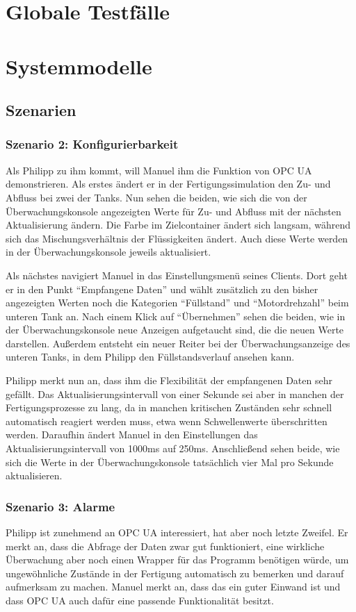 \documentclass[parskip=full]{scrartcl}
\begin{document}
\section{Globale Testfälle}
\Blindtext[1]

\section{Systemmodelle}
\subsection{Szenarien}
\subsubsection{Szenario 2: Konfigurierbarkeit}
Als Philipp zu ihm kommt, will Manuel ihm die Funktion von OPC UA demonstrieren.
Als erstes ändert er in der Fertigungssimulation den Zu- und Abfluss bei zwei der Tanks. Nun sehen die beiden, wie
sich die von der Überwachungskonsole angezeigten Werte für Zu- und Abfluss mit der nächsten Aktualisierung ändern. Die
Farbe im Zielcontainer ändert sich langsam, während sich das Mischungsverhältnis der Flüssigkeiten ändert. Auch diese
Werte werden in der Überwachungskonsole jeweils aktualisiert.

Als nächstes navigiert Manuel in das Einstellungsmenü seines Clients. Dort geht er in den Punkt ``Empfangene Daten'' und
wählt zusätzlich zu den bisher angezeigten Werten noch die Kategorien ``Füllstand'' und ``Motordrehzahl'' beim unteren Tank
an. Nach einem Klick auf ``Übernehmen'' sehen die beiden, wie in der Überwachungskonsole neue Anzeigen aufgetaucht sind,
die die neuen Werte darstellen. Außerdem entsteht ein neuer Reiter bei der Überwachungsanzeige des unteren Tanks,
in dem Philipp den Füllstandsverlauf ansehen kann.

Philipp merkt nun an, dass ihm die Flexibilität der empfangenen Daten sehr gefällt. Das Aktualisierungsintervall von
einer Sekunde sei aber in manchen der Fertigungsprozesse zu lang, da in manchen kritischen Zuständen sehr schnell
automatisch reagiert werden muss, etwa wenn Schwellenwerte überschritten werden. Daraufhin ändert Manuel in den
Einstellungen das Aktualisierungsintervall von 1000ms auf 250ms. Anschließend sehen beide, wie sich die Werte in der
Überwachungskonsole tatsächlich vier Mal pro Sekunde aktualisieren.

\subsubsection{Szenario 3: Alarme}
Philipp ist zunehmend an OPC UA interessiert, hat aber noch letzte Zweifel. Er merkt an, dass die Abfrage der Daten
zwar gut funktioniert, eine wirkliche \"Uberwachung aber noch einen Wrapper f\"ur das Programm ben\"otigen w\"urde,
um ungew\"ohnliche Zust\"ande in der Fertigung automatisch zu bemerken und darauf aufmerksam zu machen.
Manuel merkt an, dass das ein guter Einwand ist und dass OPC UA auch daf\"ur eine passende Funktionalit\"at besitzt.
\end{document}

